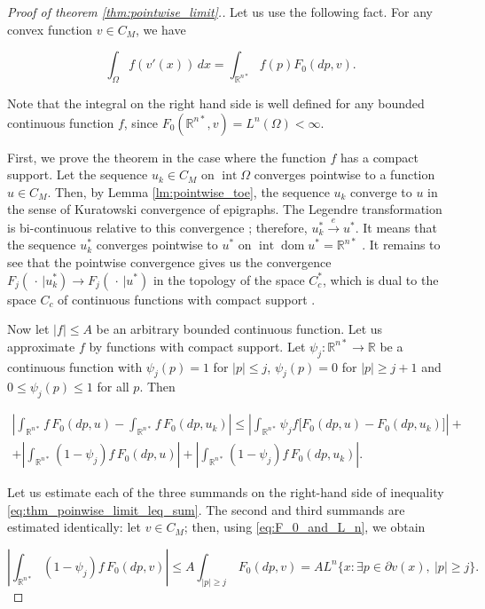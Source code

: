\documentclass[14pt]{extarticle}
\renewcommand{\le}{\leqslant}
\renewcommand{\ge}{\geqslant}
\newcommand{\R}{\mathbb{R}}
\DeclareMathOperator{\dom}{\mathrm{dom}}
\DeclareMathOperator{\Int}{\mathrm{int}}
\theoremstyle{remark}
\theoremstyle{definition}
\begin{document}
\begin{proof}[Proof of theorem \ref{thm:pointwise_limit}.]

Let us use the following fact. For any convex function $v\in C_M$, we have

	\[
		\int_\Omega f(v'(x))\,dx = \int_{\R^{n*}} f(p)F_0(dp,v).
	\]

	\noindent Note that the integral on the right hand side is well defined for any bounded continuous function $f$, since $F_0(\R^{n*},v)=L^n(\Omega)<\infty$. 

	First, we prove the theorem in the case where the function $f$ has a compact support. Let the sequence $u_k\in C_M$ on $\Int\Omega$ converges pointwise to a function $u\in C_M$. Then, by Lemma \ref{lm:pointwise_toe}, the sequence $u_k$ converge to $u$ in the sense of Kuratowski convergence of epigraphs. The Legendre transformation is bi-continuous relative to this convergence \cite[Theorem 1]{Mosco}; therefore, $u_k^*\stackrel{e}{\to}u^*$. It means that the sequence $u_k^*$ converges pointwise to $u^*$ on $\Int\dom u^*=\R^{n*}$ \cite[Corollary~3C]{Wets}. It remains to see that the pointwise convergence gives us the convergence $F_j(\,\cdot\,|u_k^*)\to F_j(\,\cdot\,|u^*)$ in the topology of the space $C_c^*$, which is dual to the space $C_c$ of continuous functions with compact support \cite[Theorem~1.1]{ColesantiHug}.

	Now let $|f|\le A$ be an arbitrary bounded continuous function. Let us approximate $f$ by functions with compact support. Let $\psi_j:\R^{n*}\to \R$ be a continuous function with $\psi_j(p)=1$ for $|p|\le j$, $\psi_j(p)=0$ for $|p|\ge j+1$ and $0\le\psi_j(p)\le 1$ for all $p$. Then
		
	\begin{multline}
	\label{eq:thm_poinwise_limit_leq_sum}
		\left|\int_{\R^{n*}}f\,F_0(dp,u) - \int_{\R^{n*}}f\,F_0(dp,u_k)\right| \le
		\left|\int_{\R^{n*}}\psi_j f\big[F_0(dp,u) - F_0(dp,u_k)\big]\right| + \\
		+\left|\int_{\R^{n*}}(1-\psi_j)f\,F_0(dp,u)\right| +
		\left|\int_{\R^{n*}}(1-\psi_j) f\,F_0(dp,u_k)\right|.
	\end{multline}

	Let us estimate each of the three summands on the right-hand side of inequality \eqref{eq:thm_poinwise_limit_leq_sum}. The second and third summands are estimated identically: let $v\in C_M$; then, using \eqref{eq:F_0_and_L_n}, we obtain

	\[
		\left|\int_{\R^{n*}}(1-\psi_j)f\,F_0(dp,v)\right| \le
		A\int_{|p|\ge j}\,F_0(dp,v) =
		A L^n\big\{x:\exists p\in\partial v(x),\ |p|\ge j\big\}.
	\]


\end{proof}
\end{document}
